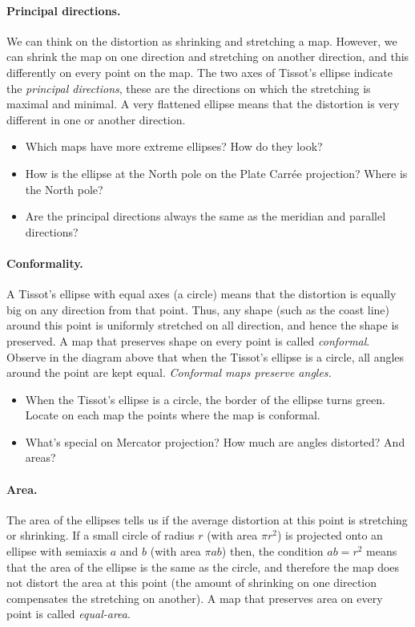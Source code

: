 \documentclass[a4paper,12pt]{article}
\begin{document}
\paragraph{Principal directions.} We can think on the distortion as shrinking and stretching a map. However, we can shrink the map on one
direction and stretching on another direction, and this differently on every point on the map. The two axes of Tissot's
ellipse indicate the \emph{principal directions}, these are the directions on which the stretching is maximal and minimal. A very
flattened ellipse means that the distortion is very different in one or another direction. 
\begin{itemize}
 \item Which maps have more extreme ellipses? How do they look?
 \item How is the ellipse at the North pole on the Plate Carrée projection? Where is the North pole?
 \item Are the principal directions always the same as the meridian and parallel directions?
\end{itemize}



\paragraph{Conformality.} A Tissot's ellipse with equal axes (a circle) means that the distortion is equally big on any direction from that
point. Thus, any shape (such as the coast line) around this point is uniformly stretched on all direction, and hence the shape is
preserved. A map that preserves shape on every point is called \emph{conformal}. Observe in the diagram above that when the Tissot's ellipse
is a circle, all angles around the point are kept equal. \emph{Conformal maps preserve angles.}
\begin{itemize}
 \item When the Tissot's ellipse is a circle, the border of the ellipse turns green. Locate on each map the points where the map is
conformal.
 \item What's special on Mercator projection? How much are angles distorted? And areas?
\end{itemize}

\paragraph{Area.} The area of the ellipses tells us if the average distortion at this point is stretching or shrinking. If a small circle
of radius $r$ (with area $\pi r^2$) is projected onto an ellipse with semiaxis $a$ and $b$ (with area $\pi a b$) then, the condition $ab=r^2$
means that the area of the ellipse is the same as the circle, and therefore the map does not distort the area at this point (the amount of
shrinking on one direction compensates the stretching on another). A map that preserves area on every point is called \emph{equal-area}.
\end{document}
